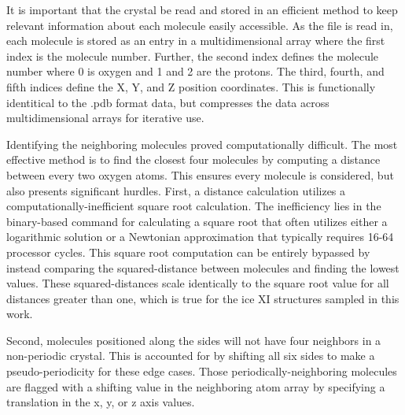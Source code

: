
It is important that the crystal be read and stored in an efficient method to keep relevant information about each molecule easily accessible. 
As the file is read in, each molecule is stored as an entry in a multidimensional array where the first index is the molecule number. 
Further, the second index defines the molecule number where 0 is oxygen and 1 and 2 are the protons. 
The third, fourth, and fifth indices define the X, Y, and Z position coordinates. 
This is functionally identitical to the .pdb format data, but compresses the data across multidimensional arrays for iterative use.


Identifying the neighboring molecules proved computationally difficult. 
The most effective method is to find the closest four molecules by computing a distance between every two oxygen atoms.
This ensures every molecule is considered, but also presents significant hurdles.
First, a distance calculation utilizes a computationally-inefficient square root calculation.
The inefficiency lies in the binary-based command for calculating a square root that often utilizes either a logarithmic solution or a Newtonian approximation that typically requires 16-64 processor cycles.
This square root computation can be entirely bypassed by instead comparing the squared-distance between molecules and finding the lowest values.
These squared-distances scale identically to the square root value for all distances greater than one, which is true for the ice XI structures sampled in this work.

Second, molecules positioned along the sides  will not have four neighbors in a non-periodic crystal. 
This is accounted for by shifting all six sides to make a pseudo-periodicity for these edge cases. 
Those periodically-neighboring molecules are flagged with a shifting value in the neighboring atom array by specifying a translation in the x, y, or z axis values. 

